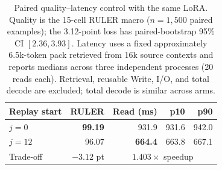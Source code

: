 \begin{table}[!htbp]
\centering
\scriptsize
\setlength{\tabcolsep}{4pt}
\begin{tabular}{@{}lrrrr@{}}
\toprule
\textbf{Replay start} & \textbf{RULER} & \textbf{Read (ms)} & \textbf{p10} & \textbf{p90} \\
\midrule
$j{=}0$  & \textbf{99.19} & 931.9 & 931.6 & 942.0 \\
$j{=}12$ & 96.07 & \textbf{664.4} & 663.8 & 667.1 \\
\midrule
Trade-off & $-3.12$ pt & \multicolumn{3}{c}{$1.403\times$ speedup} \\
\bottomrule
\end{tabular}
\caption{Paired quality--latency control with the same LoRA. Quality is the
15-cell RULER macro ($n{=}1{,}500$ paired examples); the 3.12-point loss has
paired-bootstrap 95\% CI $[2.36,3.93]$. Latency uses a fixed approximately
6.5k-token pack retrieved from 16k source contexts and reports
medians across three independent processes (20 reads each). Retrieval, reusable
Write, I/O, and total decode are excluded; total decode is similar across arms.}
\label{tab:replay-latency}
\end{table}
